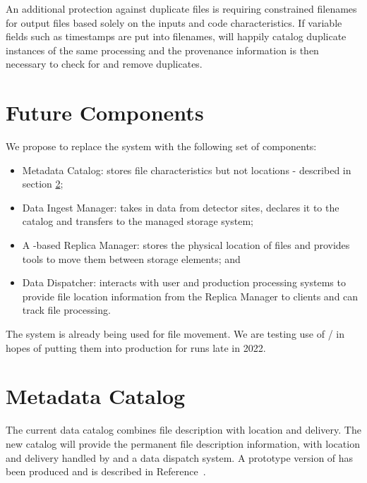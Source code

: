 \documentclass[../main-v1.tex]{subfiles}
\begin{document}
An additional protection against duplicate files is requiring constrained filenames for output files based solely on the inputs and code characteristics. If variable fields such as timestamps are put into filenames,  will happily catalog duplicate instances of the same processing and the provenance information is then necessary to check for and remove duplicates. 



\section{Future Components}
We propose to replace the  system with %
the following set of components: 

\begin{itemize}
\item {} Metadata Catalog: stores file characteristics but not locations - described in section \ref{sec:metacat};    
    \item Data Ingest Manager: takes in data from detector sites, declares it to the catalog and transfers to the managed storage system;
    \item A -based Replica Manager: stores the physical location of files and provides tools to move them between storage elements; and
    \item Data Dispatcher: interacts with user and production processing systems %
    to provide file location information from the Replica Manager to clients and can track file processing. 
\end{itemize}

The  system is already being used for file movement.  We are testing use of / in hopes of putting them into production for  runs late in 2022. 


\section{Metadata Catalog }\label{sec:metacat}

The current  data catalog combines file description with location and delivery.  The new  catalog will provide the permanent file description information, with location and delivery handled by  and a data dispatch system. 
A prototype version of  has been produced and is described in Reference~\cite{Mandrichenko:2021spd}. 
\end{document}
